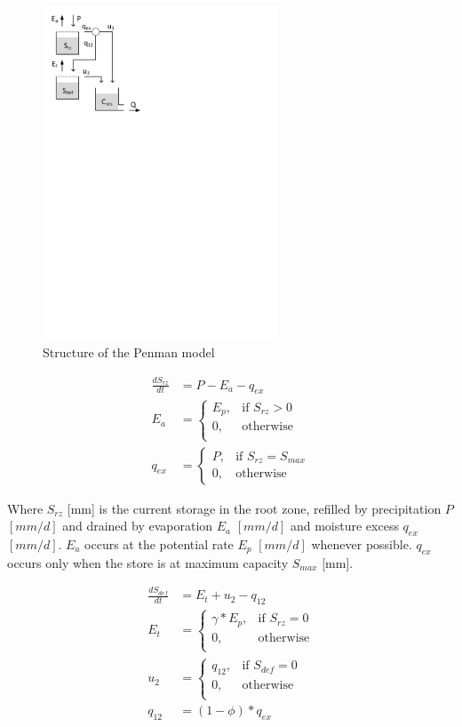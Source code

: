 { 																	%
\begin{figure}
\includegraphics[trim=1cm 20cm 7cm 1cm,width=7cm,keepaspectratio]{./files/17_schematic.pdf}
\caption{Structure of the Penman model} \label{fig:17_schematic}
\end{figure}

\begin{align}
	\frac{dS_{rz}}{dt} &= P-E_a-q_{ex} \\
	E_a &= \begin{cases}
		E_p, &\text{if } S_{rz} > 0 \\
		0, & \text{otherwise} \\
	\end{cases} \\
	q_{ex} &= 
	\begin{cases}
		P, & \text{if } S_{rz} = S_{max} \\
		0, & \text{otherwise}
	\end{cases}
\end{align}

Where $S_{rz}$ [mm] is the current storage in the root zone, refilled by precipitation $P$ $[mm/d]$ and drained by evaporation $E_a$  $[mm/d]$ and moisture excess $q_{ex}$  $[mm/d]$. $E_a$ occurs at the potential rate $E_p$  $[mm/d]$ whenever possible. $q_{ex}$ occurs only when the store is at maximum capacity $S_{max}$ [mm].

} %

\begin{align}
	\frac{dS_{def}}{dt} &= E_t+u_2-q_{12}\\
	E_t &= \begin{cases}
		\gamma*E_p, &\text{if } S_{rz} = 0 \\
		0, &\text{otherwise} \\
	\end{cases} \\
	u_2 &= \begin{cases}
		q_{12}, &\text{if } S_{def} = 0\\
		0, &\text{otherwise}\\
	\end{cases}	\\
	q_{12} &= (1-\phi)*q_{ex}
\end{align}

